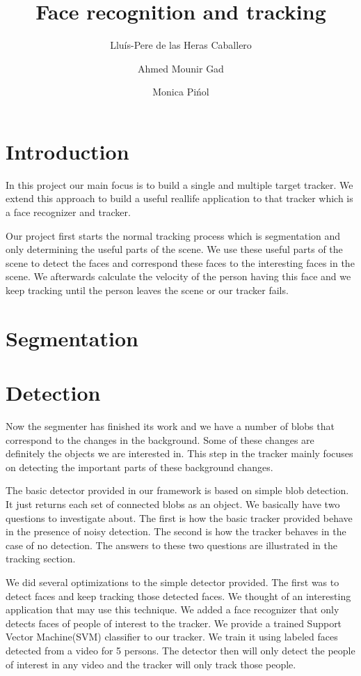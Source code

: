 \documentclass[12pt]{article}
\author{
	Llu\'{i}s-Pere de las Heras Caballero \and
	Ahmed Mounir Gad \and
	Monica Pi\'{n}ol
}
\title{Face recognition and tracking}
\begin{document}
\maketitle
\thispagestyle{empty}
\newpage

\section{Introduction}

In this project our main focus is to build a single and multiple target tracker. We extend this approach to build a useful reallife application to that tracker which is a face recognizer and tracker.

Our project first starts the normal tracking process which is segmentation and only determining the useful parts of the scene. We use these useful parts of the scene to detect the faces and correspond these faces to the interesting faces in the scene. We afterwards calculate the velocity of the person having this face and we keep tracking until the person leaves the scene or our tracker fails.

\section{Segmentation}

\section{Detection}

Now the segmenter has finished its work and we have a number of blobs that correspond to the changes in the background. Some of these changes are definitely the objects we are interested in. This step in the tracker mainly focuses on detecting the important parts of these background changes.

The basic detector provided in our framework is based on simple blob detection. It just returns each set of connected blobs as an object. We basically have two questions to investigate about. The first is how the basic tracker provided behave in the presence of noisy detection. The second is how the tracker behaves in the case of no detection. The answers to these two questions are illustrated in the tracking section.

We did several optimizations to the simple detector provided. The first was to detect faces and keep tracking those detected faces. We thought of an interesting application that may use this technique. We added a face recognizer that only detects faces of people of interest to the tracker. We provide a trained Support Vector Machine(SVM) classifier to our tracker. We train it using labeled faces detected from a video for 5 persons. The detector then will only detect the people of interest in any video and the tracker will only track those people.
\end{document}
